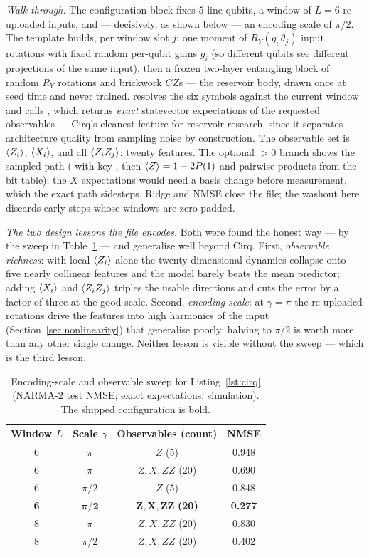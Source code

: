 \emph{Walk-through.} The configuration block fixes $5$ line qubits, a window
of $L=6$ re-uploaded inputs, and --- decisively, as shown below --- an encoding
scale of $\pi/2$. The template builds, per window slot $j$: one moment of
$R_Y(g_i\,\theta_j)$ input rotations with fixed random per-qubit gains $g_i$
(so different qubits see different projections of the same input), then a
frozen two-layer entangling block of random $R_Y$ rotations and brickwork
$CZ$s --- the reservoir body, drawn once at seed time and never trained.
 resolves the six symbols against the current
window and calls , which returns
\emph{exact} statevector expectations of the requested observables ---
Cirq's cleanest feature for reservoir research, since it separates
architecture quality from sampling noise by construction. The observable set
is $\langle Z_i\rangle$, $\langle X_i\rangle$, and all $\langle Z_iZ_j\rangle$: twenty features. The
optional $>0$ branch shows the sampled path
( with key , then $\langle Z\rangle=1-2P(1)$ and pairwise
products from the bit table); the $X$ expectations would need a basis change
before measurement, which the exact path sidesteps. Ridge and NMSE close the
file; the washout here discards early steps whose windows are zero-padded.

\emph{The two design lessons the file encodes.} Both were found the honest
way --- by the sweep in Table~\ref{tab:cirq-sweep} --- and generalise well beyond
Cirq. First, \emph{observable richness}: with local $\langle Z_i\rangle$ alone the
twenty-dimensional dynamics collapse onto five nearly collinear features and
the model barely beats the mean predictor; adding $\langle X_i\rangle$ and
$\langle Z_iZ_j\rangle$ triples the usable directions and cuts the error by a factor of
three at the good scale. Second, \emph{encoding scale}: at $\gamma=\pi$ the
re-uploaded rotations drive the features into high harmonics of the input
(Section~\ref{sec:nonlinearity}) that generalise poorly; halving to $\pi/2$
is worth more than any other single change. Neither lesson is visible without
the sweep --- which is the third lesson.

\begin{table}[h]
\centering\small
\caption{Encoding-scale and observable sweep for
Listing~\ref{lst:cirq} (NARMA-2 test NMSE; exact expectations; simulation).
The shipped configuration is bold.}
\label{tab:cirq-sweep}
\begin{tabular}{@{}cccc@{}}
\toprule
Window $L$ & Scale $\gamma$ & Observables (count) & NMSE \\
\midrule
6 & $\pi$   & $Z$ (5)            & 0.948 \\
6 & $\pi$   & $Z,X,ZZ$ (20)      & 0.690 \\
6 & $\pi/2$ & $Z$ (5)            & 0.848 \\
\textbf{6} & $\bm{\pi/2}$ & $\bm{Z,X,ZZ}$ \textbf{(20)} & \textbf{0.277} \\
8 & $\pi$   & $Z,X,ZZ$ (20)      & 0.830 \\
8 & $\pi/2$ & $Z,X,ZZ$ (20)      & 0.402 \\
\bottomrule
\end{tabular}
\end{table}


